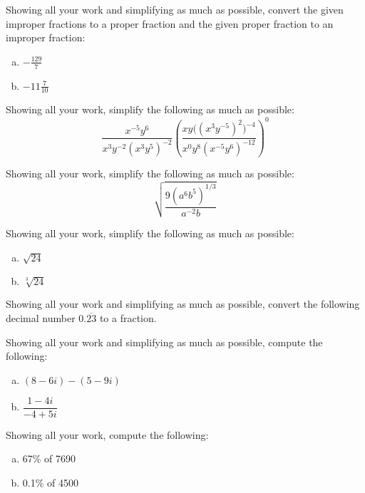 \documentclass[12pt,letterpaper]{exam}
\begin{document}
\begin{questions}
\newpage
\question[5] Showing all your work and simplifying as much as possible, convert the given improper fractions to a proper fraction and the given proper fraction to an improper fraction:
	\begin{enumerate}[(a)]
	\item $-\frac{129}{7}$
	\item $-11 \frac{7}{10}$
	\end{enumerate}



\newpage
\question[5] Showing all your work, simplify the following as much as possible: 
	\[
	\dfrac{x^{-5} y^6}{x^3 y^{-2} (x^3 y^5)^{-2}} \left( \dfrac{xy \big( (x^3 y^{-5})^2 \big)^{-4}}{x^0 y^8 (x^{-5} y^6)^{-12}} \right)^0
	\]



\newpage
\question[5] Showing all your work, simplify the following as much as possible: 
	\[
	\sqrt{ \dfrac{9 (a^6 b^5)^{1/3}}{a^{-2} b} }
	\]



\newpage
\question[5] Showing all your work, simplify the following as much as possible:
	\begin{enumerate}[(a)]
	\item $\sqrt{24}$
	\item $\sqrt[3]{24}$
	\end{enumerate}



\newpage
\question[5] Showing all your work and simplifying as much as possible, convert the following decimal number $0.\overline{23}$ to a fraction. 



\newpage
\question[5] Showing all your work and simplifying as much as possible, compute the following:
	\begin{enumerate}[(a)]
	\item $(8 - 6i) - (5 - 9i)$
	\item $\dfrac{1 - 4i}{-4 + 5i}$
	\end{enumerate}



\newpage
\question[5] Showing all your work, compute the following:
	\begin{enumerate}[(a)]
	\item 67\% of 7690
	\item 0.1\% of 4500
	\end{enumerate}




\end{questions}
\end{document}
